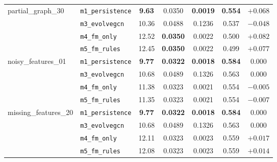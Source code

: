 \begin{table}[!htbp]
\begin{tabular}{l l c c c c c}
\midrule
\multirow{4}{*}{partial\_graph\_30}
& \texttt{m1\_persistence} & \textbf{9.63}  & 0.0350          & \textbf{0.0019} & \textbf{0.554} & $+0.068$ \\
& \texttt{m3\_evolvegcn}   & 10.36          & 0.0488          & 0.1236          & 0.537          & $\mathbf{-0.048}$ \\
& \texttt{m4\_fm\_only}    & 12.52          & \textbf{0.0350} & 0.0022          & 0.500          & $+0.082$ \\
& \texttt{m5\_fm\_rules}   & 12.45          & \textbf{0.0350} & 0.0022          & 0.499          & $+0.077$ \\
\midrule
\multirow{4}{*}{noisy\_features\_01}
& \texttt{m1\_persistence} & \textbf{9.77}  & \textbf{0.0322} & \textbf{0.0018} & \textbf{0.584} & $\mathbf{0.000}$ \\
& \texttt{m3\_evolvegcn}   & 10.68          & 0.0489          & 0.1326          & 0.563          & $\mathbf{0.000}$ \\
& \texttt{m4\_fm\_only}    & 11.38          & 0.0323          & 0.0021          & 0.554          & $-0.005$ \\
& \texttt{m5\_fm\_rules}   & 11.35          & 0.0323          & 0.0021          & 0.554          & $-0.007$ \\
\midrule
\multirow{4}{*}{missing\_features\_20}
& \texttt{m1\_persistence} & \textbf{9.77}  & \textbf{0.0322} & \textbf{0.0018} & \textbf{0.584} & $\mathbf{0.000}$ \\
& \texttt{m3\_evolvegcn}   & 10.68          & 0.0489          & 0.1326          & 0.563          & $\mathbf{0.000}$ \\
& \texttt{m4\_fm\_only}    & 12.11          & 0.0323          & 0.0023          & 0.559          & $+0.017$ \\
& \texttt{m5\_fm\_rules}   & 12.08          & 0.0323          & 0.0023          & 0.559          & $+0.014$ \\
\bottomrule
\end{tabular}
\end{table}

